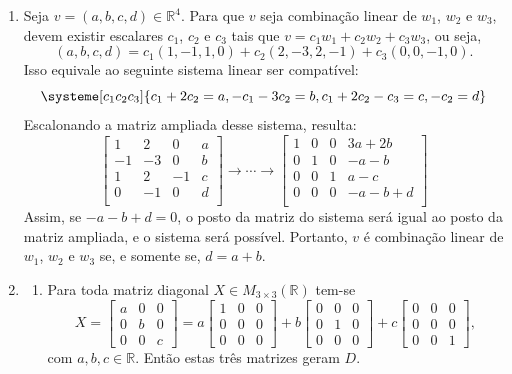\documentclass[12pt,a4paper]{article}
\newcommand*\R{\mathbb{R}}
\begin{document}
\begin{enumerate}
\item Seja $v = (a,b,c,d) \in \R^4$. Para que $v$ seja combinação linear de $w_1$, $w_2$ e $w_3$, devem existir escalares $c_1$, $c_2$ e $c_3$ tais que $v = c_1w_1 + c_2w_2 + c_3w_3$, ou seja,
\[
(a,b,c,d) = c_1(1,-1,1,0) + c_2(2,-3,2,-1) + c_3(0,0,-1,0).
\]
Isso equivale ao seguinte sistema linear ser compatível:
\[
\systeme[c_1c_2c_3]{
 c_1 + 2c_2 = a,
-c_1 - 3c_2 = b,
 c_1 + 2c_2 -c_3 = c,
       -c_2      = d
}
\]
Escalonando a matriz ampliada desse sistema, resulta:
\[
\begin{bmatrix}
 1 &  2 &  0 & a\\
-1 & -3 &  0 & b\\
 1 &  2 & -1 & c\\
 0 & -1 &  0 & d\\
\end{bmatrix}
\rightarrow
\cdots
\rightarrow
\begin{bmatrix}
 1 & 0 & 0 & 3a+2b\\
 0 & 1 & 0 & -a-b \\
 0 & 0 & 1 &  a-c  \\
 0 & 0 & 0 & -a-b+d \\
\end{bmatrix}
\]
Assim, se $-a-b+d = 0$, o posto da matriz do sistema será igual ao posto da matriz ampliada, e o sistema será possível. Portanto, $v$ é combinação linear de $w_1$, $w_2$ e $w_3$ se, e somente se, $d = a+b$.

\item
\begin{enumerate}
\item Para toda matriz diagonal $X \in M_{3 \times 3}(\R)$ tem-se
\[
X
= \begin{bmatrix}
a & 0 & 0 \\
0 & b & 0 \\
0 & 0 & c
\end{bmatrix}
=
a
\begin{bmatrix}
1 & 0 & 0 \\
0 & 0 & 0 \\
0 & 0 & 0
\end{bmatrix}
+b
\begin{bmatrix}
0 & 0 & 0 \\
0 & 1 & 0 \\
0 & 0 & 0
\end{bmatrix}
+c
\begin{bmatrix}
0 & 0 & 0 \\
0 & 0 & 0 \\
0 & 0 & 1
\end{bmatrix},
\]
com $a,b,c \in \R$. Então estas três matrizes geram $D$.


\end{enumerate}
\end{enumerate}
\end{document}
